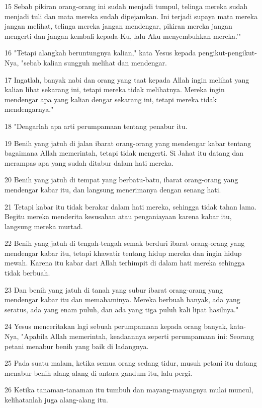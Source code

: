 \par 15 Sebab pikiran orang-orang ini sudah menjadi tumpul, telinga mereka sudah menjadi tuli dan mata mereka sudah dipejamkan. Ini terjadi supaya mata mereka jangan melihat, telinga mereka jangan mendengar, pikiran mereka jangan mengerti dan jangan kembali kepada-Ku, lalu Aku menyembuhkan mereka.'"
\par 16 "Tetapi alangkah beruntungnya kalian," kata Yesus kepada pengikut-pengikut-Nya, "sebab kalian sungguh melihat dan mendengar.
\par 17 Ingatlah, banyak nabi dan orang yang taat kepada Allah ingin melihat yang kalian lihat sekarang ini, tetapi mereka tidak melihatnya. Mereka ingin mendengar apa yang kalian dengar sekarang ini, tetapi mereka tidak mendengarnya."
\par 18 "Dengarlah apa arti perumpamaan tentang penabur itu.
\par 19 Benih yang jatuh di jalan ibarat orang-orang yang mendengar kabar tentang bagaimana Allah memerintah, tetapi tidak mengerti. Si Jahat itu datang dan merampas apa yang sudah ditabur dalam hati mereka.
\par 20 Benih yang jatuh di tempat yang berbatu-batu, ibarat orang-orang yang mendengar kabar itu, dan langsung menerimanya dengan senang hati.
\par 21 Tetapi kabar itu tidak berakar dalam hati mereka, sehingga tidak tahan lama. Begitu mereka menderita kesusahan atau penganiayaan karena kabar itu, langsung mereka murtad.
\par 22 Benih yang jatuh di tengah-tengah semak berduri ibarat orang-orang yang mendengar kabar itu, tetapi khawatir tentang hidup mereka dan ingin hidup mewah. Karena itu kabar dari Allah terhimpit di dalam hati mereka sehingga tidak berbuah.
\par 23 Dan benih yang jatuh di tanah yang subur ibarat orang-orang yang mendengar kabar itu dan memahaminya. Mereka berbuah banyak, ada yang seratus, ada yang enam puluh, dan ada yang tiga puluh kali lipat hasilnya."
\par 24 Yesus menceritakan lagi sebuah perumpamaan kepada orang banyak, kata-Nya, "Apabila Allah memerintah, keadaannya seperti perumpamaan ini: Seorang petani menabur benih yang baik di ladangnya.
\par 25 Pada suatu malam, ketika semua orang sedang tidur, musuh petani itu datang menabur benih alang-alang di antara gandum itu, lalu pergi.
\par 26 Ketika tanaman-tanaman itu tumbuh dan mayang-mayangnya mulai muncul, kelihatanlah juga alang-alang itu.
